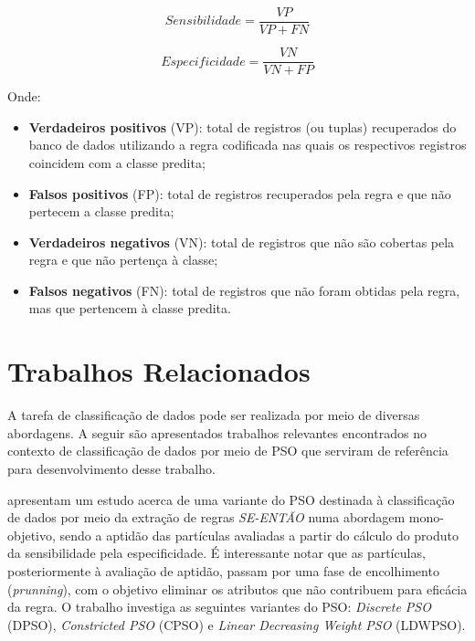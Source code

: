 \documentclass[
	12pt,				%
	openany,			%
	oneside,	
	a4paper,			%
	brazil,				%
	]{unimontes-ppgmsc-abntex2}
\begin{document}
\begin{equation}
\label{eq:sensibilidade}
Sensibilidade = \frac{VP}{VP + FN}
\end{equation}

\begin{equation}
\label{eq:especificidade}
Especificidade = \frac{VN}{VN + FP}
\end{equation}

Onde:

\begin{itemize}
\item \textbf{Verdadeiros positivos} (VP): total de registros (ou tuplas) recuperados do banco de dados utilizando a regra codificada nas quais os respectivos registros coincidem com a classe predita; 

\item \textbf{Falsos positivos} (FP): total de registros recuperados pela regra e que não pertecem a classe predita;

\item \textbf{Verdadeiros negativos} (VN): total de registros que não são cobertas pela regra e que não pertença à classe; 

\item \textbf{Falsos negativos} (FN): total de registros que não foram obtidas pela regra, mas que pertencem à classe predita.
\end{itemize}

\section{Trabalhos Relacionados}
\label{sec:trabalhos_relacionados}

A tarefa de classificação de dados pode ser realizada por meio de diversas abordagens. A seguir são apresentados trabalhos relevantes encontrados no contexto de classificação de dados por meio de PSO que serviram de referência para desenvolvimento desse trabalho.

 apresentam um estudo acerca de uma variante do PSO destinada à classificação de dados por meio da extração de regras {\em SE-ENTÃO} numa abordagem mono-objetivo, sendo a aptidão das partículas avaliadas a partir do cálculo do produto da sensibilidade pela especificidade. É interessante notar que as partículas, posteriormente à avaliação de aptidão, passam por uma fase de encolhimento ({\em prunning}), com o objetivo eliminar os atributos que não contribuem para eficácia da regra. O trabalho investiga as seguintes variantes do PSO: {\em Discrete PSO} (DPSO), {\em Constricted PSO} (CPSO) e {\em Linear Decreasing Weight PSO} (LDWPSO).
\end{document}
